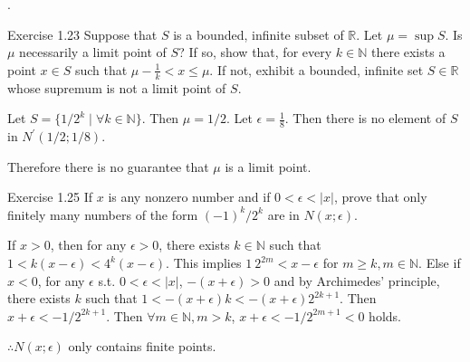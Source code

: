 \documentclass[8pt]{beamer}
\newcommand{\mbb}[1]{\mathbb{#1}}
\newcommand{\abs}[1]{\left\lvert #1 \right\rvert}
\begin{document}
\begin{frame}{.}
    \begin{block}{Exercise 1.23}
        Suppose that $S$ is a bounded, infinite subset of $\mbb{R}$.
        Let $\mu = \sup S$.
        Is $\mu$ necessarily a limit point of $S$?
        If so, show that, for every $k \in \mbb{N}$ there exists a point $x \in S$ such that $\mu - \frac{1}{k} < x \leq \mu$.
        If not, exhibit a bounded, infinite set $S \in \mbb{R}$ whose supremum is not a limit point of $S$.

        Let $S = \{1/2^k \mid \forall k \in \mbb{N}\}$.
        Then $\mu = 1/2$.
        Let $\epsilon = \frac{1}{8}$.
        Then there is no element of $S$ in $N^\prime(1/2; 1/8)$.

        Therefore there is no guarantee that $\mu$ is a limit point.
    \end{block}

    \begin{block}{Exercise 1.25}
        If $x$ is any nonzero number and if $0 < \epsilon < \abs{x}$, prove that only finitely many numbers of the form $(-1)^k/2^k$ are in $N(x;\epsilon)$.

        If $x>0$, then for any $\epsilon > 0$, there exists $k \in \mbb{N}$ such that $1 < k (x - \epsilon) < 4^k (x - \epsilon)$.
        This implies $1\ 2^{2m} < x - \epsilon$ for $m \geq k, m \in \mbb{N}$.
        Else if $x < 0$, for any $\epsilon$ s.t. $ 0 < \epsilon < \abs{x}$, $-(x+\epsilon) >0$ and by Archimedes' principle, there exists $k$ such that $1 < -(x+\epsilon) k  < -(x+\epsilon) 2^{2k+1}$.
        Then $x + \epsilon < -1/2^{2k+1}$.
        Then $\forall m \in \mbb{N}, m > k$, $x + \epsilon < -1/2^{2m+1} <0$ holds.

        $\therefore N(x; \epsilon)$ only contains finite points.
    \end{block}
\end{frame}
\end{document}
